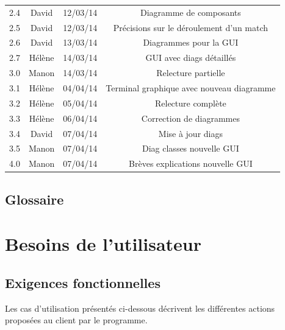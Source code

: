 \documentclass[a4paper,titlepage]{scrreprt}
\begin{document}
\begin{tabular}{|c|c|c|c|}
    2.4 & David & 12/03/14 & Diagramme de composants \\
    2.5 & David & 12/03/14 & Précisions sur le déroulement d'un match \\
    2.6 & David & 13/03/14 & Diagrammes pour la GUI \\
    2.7 & Hélène & 14/03/14 & GUI avec diags détaillés\\
    3.0 & Manon & 14/03/14 & Relecture partielle \\
    3.1 & Hélène & 04/04/14 & Terminal graphique avec nouveau diagramme\\
    3.2 & Hélène & 05/04/14 & Relecture complète\\
    3.3 & Hélène & 06/04/14 & Correction de diagrammes\\
    3.4 & David & 07/04/14 & Mise à jour diags \\
    3.5 & Manon & 07/04/14 & Diag classes nouvelle GUI \\
    4.0 & Manon & 07/04/14 & Brèves explications nouvelle GUI \\
    \hline
  \end{tabular}


\section{Glossaire}
  \removepagebreak
  \printglossaries
  \restorepagebreak
\chapter{Besoins de l'utilisateur}
  
  
\section{Exigences fonctionnelles}
  
  Les cas d'utilisation présentés ci-dessous décrivent les différentes actions proposées au client par le programme.
\end{document}

